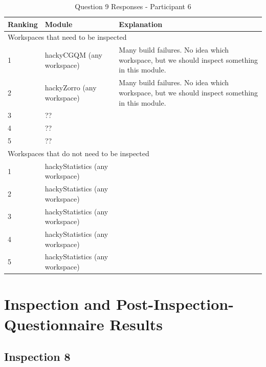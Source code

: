 \begin{table}[!h]
  \begin{center}
    \caption{Question 9 Responses - Participant 6}
    \label{tab:pre-selection-questionnaire-results-9-p6}
    \begin{tabular}{|p{2.0cm}|p{7.0cm}|p{4.0cm}|} \hline
{\bf Ranking} & {\bf Module} & {\bf Explanation} \\ \hline
\multicolumn{3}{|p{13.0cm}|}{Workspaces that need to be inspected} \\ \hline
1 & hackyCGQM (any workspace) & Many build failures. No idea which
workspace, but we should inspect something in this module. \\ \hline
2 & hackyZorro (any workspace) & Many build failures. No idea which
workspace, but we should inspect something in this module. \\ \hline
3 & ?? & \\ \hline
4 & ?? & \\ \hline
5 & ?? & \\ \hline
\multicolumn{3}{|p{13.0cm}|}{Workspaces that do not need to be inspected} \\ \hline
1 & hackyStatistics (any workspace) & \\ \hline
2 & hackyStatistics (any workspace) & \\ \hline
3 & hackyStatistics (any workspace) & \\ \hline
4 & hackyStatistics (any workspace) & \\ \hline
5 & hackyStatistics (any workspace) & \\ \hline
    \end{tabular}
  \end{center}
\end{table}






\chapter{Inspection and Post-Inspection-Questionnaire Results}
\label{appendix:chapter:inspection-results}




\section{Inspection 8}
\label{appendix:section:inspection8}


